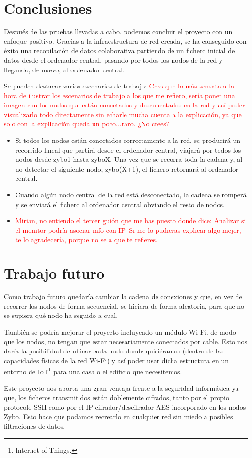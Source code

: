 \section{Conclusiones}
Después de las pruebas llevadas a cabo, podemos concluir el proyecto con un enfoque positivo. Gracias a la infraestructura de red creada, se ha conseguido con éxito una recopilación de datos colaborativa partiendo de un fichero inicial de datos desde el ordenador central, pasando por todos los nodos de la red y llegando, de nuevo, al ordenador central.

Se pueden destacar varios escenarios de trabajo: \textcolor{red}{Creo que lo más sensato a la hora de ilustrar los escenarios de trabajo a los que me refiero, sería poner una imagen con los nodos que están conectados y desconectados en la red y así poder visualizarlo todo directamente sin echarle mucha cuenta a la explicación, ya que solo con la explicación queda un poco...raro. ¿No crees?}
\begin{itemize}
	\item Si todos los nodos están conectados correctamente a la red, se producirá un recorrido lineal que partirá desde el ordenador central, viajará por todos los nodos desde zybo1 hasta zyboX. Una vez que se recorra toda la cadena y, al no detectar el siguiente nodo, zybo(X+1), el fichero retornará al ordenador central.
	\item Cuando algún nodo central de la red está desconectado, la cadena se romperá y se enviará el fichero al ordenador central obviando el resto de nodos.
	\item \textcolor{red}{Mirian, no entiendo el tercer guión que me has puesto donde dice: Analizar si el monitor podría asociar info con IP. Si me lo pudieras explicar algo mejor, te lo agradecería, porque no se a que te refieres.}
\end{itemize}

\section{Trabajo futuro}
Como trabajo futuro quedaría cambiar la cadena de conexiones y que, en vez de recorrer los nodos de forma secuencial, se hiciera de forma aleatoria, para que no se supiera qué nodo ha seguido a cual.

También se podría mejorar el proyecto incluyendo un módulo Wi-Fi, de modo que los nodos, no tengan que estar necesariamente conectados por cable. Esto nos daría la posibilidad de ubicar cada nodo donde quisiéramos (dentro de las capacidades físicas de la red Wi-Fi) y así poder usar dicha estructura en un entorno de IoT\footnote{Internet of Things.} para una casa o el edificio que necesitemos.

Este proyecto nos aporta una gran ventaja frente a la seguridad informática ya que, los ficheros transmitidos están doblemente cifrados, tanto por el propio protocolo SSH como por el IP cifrador/descifrador AES incorporado en los nodos Zybo. Esto hace que podamos recrearlo en cualquier red sin miedo a posibles filtraciones de datos.